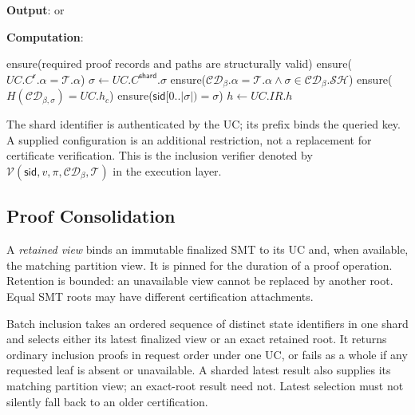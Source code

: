 \textbf{Output}: \TRUE or \FALSE

\textbf{Computation}:
\begin{algorithmic}[0]
	\State ensure(required proof records and paths are structurally valid)
	\State ensure($UC.C^\mathsf{r}.\alpha = \mathcal{T}.\alpha$) 
	\State $\sigma \gets UC.C^\mathsf{shard}.\sigma$
		\State ensure($\mathcal{CD}_\beta.\alpha = \mathcal{T}.\alpha\land\sigma\in\mathcal{CD}_\beta.\mathcal{SH}$)
		\State ensure($H(\mathcal{CD}_{\beta,\sigma})=UC.h_c$)
	\EndIf
	\State ensure($\mathsf{sid}[0..|\sigma|)=\sigma$) 
	\State $h \gets UC.IR.h$ 
	 \Return \FALSE \EndIf
	 \Return \FALSE \EndIf
	\State \Return \TRUE
\end{algorithmic}

The shard identifier is authenticated by the UC; its prefix binds the queried key. A supplied configuration is an additional restriction, not a replacement for certificate verification. This is the inclusion verifier denoted by $\mathcal{V}(\mathsf{sid},v,\pi,\mathcal{CD}_\beta,\mathcal{T})$ in the execution layer.

\subsection{Proof Consolidation}\label{sec:consolidation}

A \emph{retained view} binds an immutable finalized SMT to its UC and, when available, the matching partition view. It is pinned for the duration of a proof operation. Retention is bounded: an unavailable view cannot be replaced by another root. Equal SMT roots may have different certification attachments.

Batch inclusion takes an ordered sequence of distinct state identifiers in one shard and selects either its latest finalized view or an exact retained root. It returns ordinary inclusion proofs in request order under one UC, or fails as a whole if any requested leaf is absent or unavailable. A sharded latest result also supplies its matching partition view; an exact-root result need not. Latest selection must not silently fall back to an older certification.

